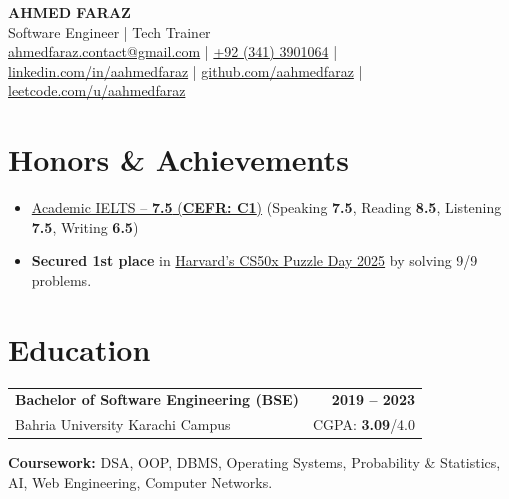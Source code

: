 \documentclass[a4paper,12pt]{article}
\begin{document}
\pagestyle{empty}

\begin{center}
    {\Huge \textbf{AHMED FARAZ}}\\[2pt]  %
    {\large Software Engineer | Tech Trainer}\\[6pt]  %
    \href{mailto:ahmedfaraz.contact@gmail.com}{ahmedfaraz.contact@gmail.com}
    \quad | \quad
    \href{tel:+923413901064}{+92 (341) 3901064}
    \quad | \quad
    \href{https://linkedin.com/in/aahmedfaraz}{linkedin.com/in/aahmedfaraz}
    \quad | \quad
    \href{https://github.com/aahmedfaraz}{github.com/aahmedfaraz}
    \quad | \quad
    \href{https://leetcode.com/u/aahmedfaraz/}{leetcode.com/u/aahmedfaraz}
\end{center}

\section{Honors \& Achievements}
\begin{itemize}
    \item \href{https://drive.google.com/file/d/1uHFju1PVdf3HQKPWlZkGIML0tiujyYCi/view?usp=sharing}{Academic IELTS -- \textbf{7.5} (\textbf{CEFR: C1})} (Speaking \textbf{7.5}, Reading \textbf{8.5}, Listening \textbf{7.5}, Writing \textbf{6.5})
    \item \textbf{Secured 1st place} in \href{https://certificates.cs50.io/5ed8854f-112a-4bbb-bb85-108d92f3233b.pdf?size=letter}{Harvard's CS50x Puzzle Day 2025} by solving 9/9 problems.
\end{itemize}

\section{Education}

\begin{tabularx}{\linewidth}{@{}X r@{}}
\textbf{Bachelor of Software Engineering (BSE)} & \textbf{2019 -- 2023} \\
Bahria University Karachi Campus & CGPA: \textbf{3.09}/4.0 \\
\end{tabularx}
\textbf{Coursework:} DSA, OOP, DBMS, Operating Systems, Probability \& Statistics, AI, Web Engineering, Computer Networks.
\end{document}
